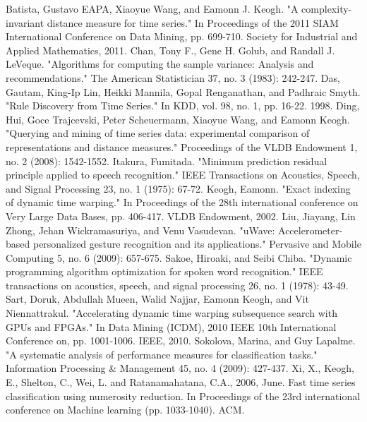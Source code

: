 \newpage
\begin{thebibliography}{1} 
    \normalsize
     Batista, Gustavo EAPA, Xiaoyue Wang, and Eamonn J. Keogh. "A complexity-invariant
        distance measure for time series." In Proceedings of the 2011 SIAM International Conference on Data Mining, pp.
        699-710. Society for Industrial and Applied Mathematics, 2011.
     Chan, Tony F., Gene H. Golub, and Randall J. LeVeque. "Algorithms for computing the
        sample variance: Analysis and recommendations." The American Statistician 37, no. 3 (1983): 242-247.
     Das, Gautam, King-Ip Lin, Heikki Mannila, Gopal Renganathan, and Padhraic Smyth. "Rule
        Discovery from Time Series." In KDD, vol. 98, no. 1, pp. 16-22. 1998.
     Ding, Hui, Goce Trajcevski, Peter Scheuermann, Xiaoyue Wang, and Eamonn Keogh. "Querying
        and mining of time series data: experimental comparison of representations and distance measures." Proceedings
        of the VLDB Endowment 1, no. 2 (2008): 1542-1552.
     Itakura, Fumitada. "Minimum prediction residual principle applied to speech
        recognition." IEEE Transactions on Acoustics, Speech, and Signal Processing 23, no. 1 (1975): 67-72.
     Keogh, Eamonn. "Exact indexing of dynamic time warping." In Proceedings of the 28th
        international conference on Very Large Data Bases, pp. 406-417. VLDB Endowment, 2002.
     Liu, Jiayang, Lin Zhong, Jehan Wickramasuriya, and Venu Vasudevan. "uWave:
        Accelerometer-based personalized gesture recognition and its applications." Pervasive and Mobile Computing 5,
        no. 6 (2009): 657-675.
     Sakoe, Hiroaki, and Seibi Chiba. "Dynamic programming algorithm optimization for spoken
        word recognition." IEEE transactions on acoustics, speech, and signal processing 26, no. 1 (1978): 43-49.
     Sart, Doruk, Abdullah Mueen, Walid Najjar, Eamonn Keogh, and Vit Niennattrakul.
        "Accelerating dynamic time warping subsequence search with GPUs and FPGAs." In Data Mining (ICDM), 2010 IEEE
        10th International Conference on, pp. 1001-1006. IEEE, 2010.
     Sokolova, Marina, and Guy Lapalme. "A systematic analysis of performance measures
        for classification tasks." Information Processing \& Management 45, no. 4 (2009): 427-437.
     Xi, X., Keogh, E., Shelton, C., Wei, L. and Ratanamahatana, C.A., 2006, June. Fast time series
        classification using numerosity reduction. In Proceedings of the 23rd international conference on Machine
        learning (pp. 1033-1040). ACM.
\end{thebibliography}
